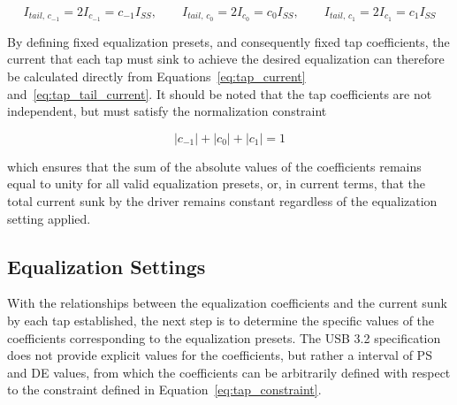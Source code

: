 \begin{equation}
I_{tail,\,c_{-1}} = 2 I_{c_{-1}} = c_{-1} I_{SS}, \qquad
I_{tail,\,c_0} = 2 I_{c_0} = c_0 I_{SS}, \qquad
I_{tail,\,c_1} = 2 I_{c_1} = c_1 I_{SS}
\label{eq:tap_tail_current}
\end{equation}

By defining fixed equalization presets, and consequently fixed tap coefficients, the current that each tap must sink to achieve the desired equalization can therefore be calculated directly from Equations~\eqref{eq:tap_current} and~\eqref{eq:tap_tail_current}. It should be noted that the tap coefficients are not independent, but must satisfy the normalization constraint

\begin{equation}
|c_{-1}| + |c_0| + |c_1| = 1
\label{eq:tap_constraint}
\end{equation}

which ensures that the sum of the absolute values of the coefficients remains equal to unity for all valid equalization presets, or, in current terms, that the total current sunk by the driver remains constant regardless of the equalization setting applied.

\subsection{Equalization Settings}

With the relationships between the equalization coefficients and the current sunk by each tap established, the next step is to determine the specific values of the coefficients corresponding to the equalization presets. The \ac{USB} 3.2 specification does not provide explicit values for the coefficients, but rather a interval of \ac{PS} and \ac{DE} values, from which the coefficients can be arbitrarily defined with respect to the constraint defined in Equation~\eqref{eq:tap_constraint}. 

